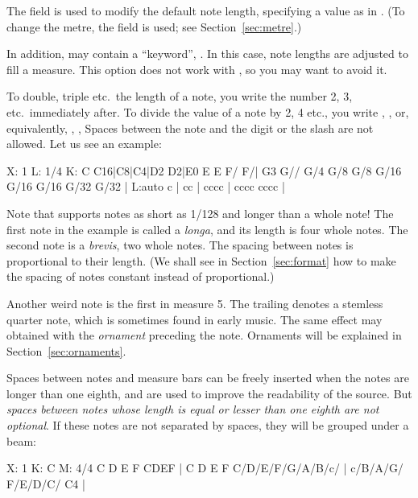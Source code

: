 \documentclass[a4paper,12pt]{book}
\begin{document}
The  field is used to modify the default note length,
specifying a value as in . (To change the metre, the
 field is used; see Section~\ref{sec:metre}.)

In addition,  may contain a ``keyword'', . In
this case, note lengths are adjusted to fill a measure. This option
does not work with \abcmid{}, so you may want to avoid it.

To double, triple etc.\ the length of a note, you write the number 2,
3, etc.\ immediately after. To divide the value of a note by 2, 4
etc., you write , ,  or, equivalently,
\car{/}, \car{//}, \car{///}{\ldots} Spaces between the note and the
digit or the slash are not allowed. Let us see an example:

\begin{abcsource}
X: 1
L: 1/4
K: C
C16|C8|C4|D2 D2|E0 E E F/ F/|
G3 G// G/4 G/8 G/8 G/16 G/16 G/16 G/32 G/32 |
L:auto
c | cc | cccc | cccc cccc |
\end{abcsource}


Note that \abcm{} supports notes as short as 1/128 and longer than a
whole note! The first note in the example is called a \emph{longa},
and its length is four whole notes. The second note is a
\emph{brevis}, two whole notes. The spacing between notes is
proportional to their length. (We shall see in
Section~\ref{sec:format} how to make the spacing of notes constant
instead of proportional.)

Another weird note is the first  in measure 5. The trailing
 denotes a stemless quarter note, which is sometimes found in
early music. \devel{} The same effect may obtained with the
 \emph{ornament} preceding the note. Ornaments will be
explained in Section~\ref{sec:ornaments}.

Spaces between notes and measure bars can be freely inserted when the
notes are longer than one eighth, and are used to improve the
readability of the source. But \emph{spaces between notes whose length
is equal or lesser than one eighth are not optional}. If these notes
are not separated by spaces, they will be grouped under a beam:

\begin{abcsource}
X: 1
K: C
M: 4/4
% 
C D E F CDEF | C D E F C/D/E/F/G/A/B/c/ |
c/B/A/G/ F/E/D/C/ C4 |
\end{abcsource}
\end{document}
